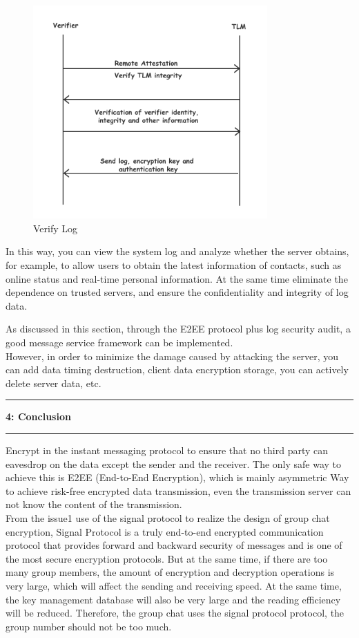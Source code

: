 \documentclass[11pt]{article}
\newcommand\question[2]{\vspace{.25in}\hrule\textbf{#1: #2}\vspace{.5em}\hrule\vspace{.10in}}
\begin{document}
\begin{figure}[H]
    \centering
    \includegraphics[width=0.8\textwidth]{Fig7}
    \caption{Verify Log}
\end{figure}

In this way, you can view the system log and analyze whether the server obtains, for example, to allow users to obtain the latest information of contacts, such as online status and real-time personal information. 
At the same time eliminate the dependence on trusted servers, and ensure the confidentiality and integrity of log data.

As discussed in this section, through the E2EE protocol plus log security audit, a good message service framework can be implemented. \\

However, in order to minimize the damage caused by attacking the server, you can add data timing destruction, client data encryption storage, you can actively delete server data, etc.


\question{4}{Conclusion}
Encrypt in the instant messaging protocol to ensure that no third party can eavesdrop on the data except the sender and the receiver. The only safe way to achieve this is E2EE (End-to-End Encryption), which is mainly asymmetric 
Way to achieve risk-free encrypted data transmission, even the transmission server can not know the content of the transmission.\\

From the issue1 use of the signal protocol to realize the design of group chat encryption, Signal Protocol is a truly end-to-end encrypted communication protocol that provides forward and backward security of messages and is one of the most secure encryption protocols. 
But at the same time, if there are too many group members, the amount of encryption and decryption operations is very large, which will affect the sending and receiving speed. At the same time, the key management database will also be very large and the reading efficiency will be reduced. 
Therefore, the group chat uses the signal protocol protocol, the group number should not be too much.\\
\end{document}
